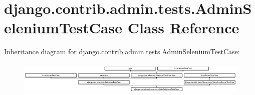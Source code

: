 \hypertarget{classdjango_1_1contrib_1_1admin_1_1tests_1_1_admin_selenium_test_case}{}\section{django.\+contrib.\+admin.\+tests.\+Admin\+Selenium\+Test\+Case Class Reference}
\label{classdjango_1_1contrib_1_1admin_1_1tests_1_1_admin_selenium_test_case}
Inheritance diagram for django.\+contrib.\+admin.\+tests.\+Admin\+Selenium\+Test\+Case\+:\begin{figure}[H]
\begin{center}
\leavevmode
\includegraphics[height=1.613833cm]{classdjango_1_1contrib_1_1admin_1_1tests_1_1_admin_selenium_test_case}
\end{center}
\end{figure}
